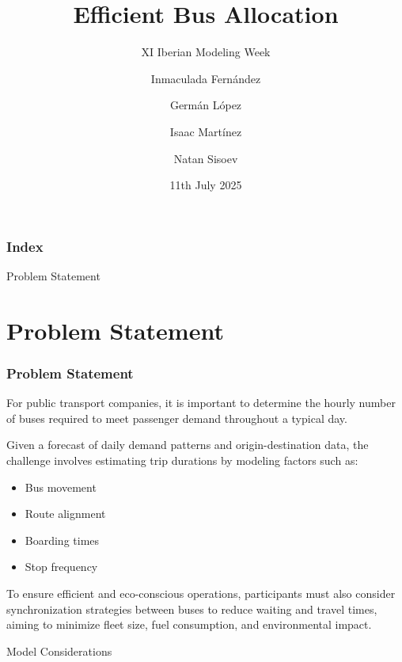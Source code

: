\documentclass[12pt]{beamer}
\title{Efficient Bus Allocation}
\subtitle{XI Iberian Modeling Week}
\author{Inmaculada Fernández \and Germán López \and Isaac Martínez \and Natan Sisoev}
\date{11th July 2025}
\institute{Centre de Recerca Matemàtica}
\begin{document}
\frame{\titlepage}

\begin{frame}
\frametitle{Index}
\tableofcontents
\end{frame}

\begin{frame}
\begin{center}
\Huge{Problem Statement}
\end{center}
\end{frame}

\section{Problem Statement}
\begin{frame}
\frametitle{Problem Statement}
For public transport companies, it is important to determine the hourly number of buses required to meet passenger demand throughout a typical day.

\vspace{0.3cm}
Given a forecast of daily demand patterns and origin-destination data, the challenge involves estimating trip durations by modeling factors such as:
\begin{itemize}
\item Bus movement
\item Route alignment
\item Boarding times
\item Stop frequency
\end{itemize}

\vspace{0.3cm}
To ensure efficient and eco-conscious operations, participants must also consider synchronization strategies between buses to reduce waiting and travel times, aiming to minimize fleet size, fuel consumption, and environmental impact.
\end{frame}

\begin{frame}
\begin{center}
\Huge{Model Considerations}
\end{center}
\end{frame}
\end{document}
